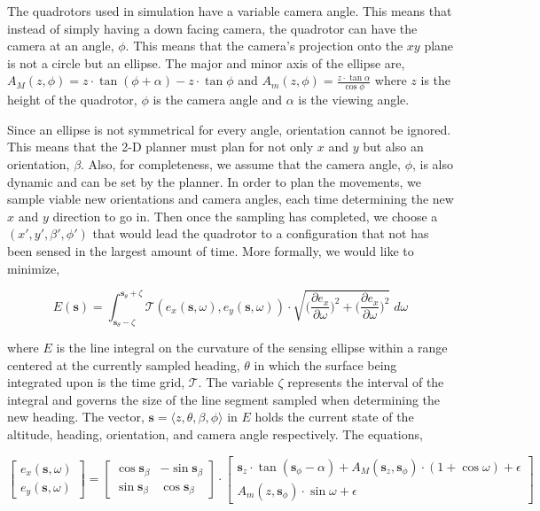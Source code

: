 \documentclass[12pt]{article}
\newcommand{\s}{\textbf{s}}
\begin{document}
The quadrotors used in simulation have a variable camera angle. This means that
instead of simply having a down facing camera, the quadrotor can have the
camera at an angle, $\phi$. This means that the camera's projection onto the
$xy$ plane is not a circle but an ellipse. The major and minor axis of the
ellipse are, $ A_M(z, \phi) = z \cdot \tan{(\phi + \alpha)} - z \cdot
\tan{\phi} $ and $ A_m(z, \phi) = \frac{z \cdot \tan{\alpha}}{\cos{\phi}} $
where $z$ is the height of the quadrotor, $\phi$ is the camera angle and
$\alpha$ is the viewing angle.

Since an ellipse is not symmetrical for every angle, orientation cannot be
ignored.  This means that the 2-D planner must plan for not only $x$ and $y$
but also an orientation, $\beta$. Also, for completeness, we assume that the
camera angle, $\phi$, is also dynamic and can be set by the planner. In order
to plan the movements, we sample viable new orientations and camera angles,
each time determining the new $x$ and $y$ direction to go in.  Then once the
sampling has completed, we choose a $(x', y',
\beta', \phi')$ that would lead the quadrotor to a configuration that not has
been sensed in the largest amount of time. More formally, we would like to
minimize,

$$ E(\s) = \int_{\s_{\theta} - \zeta}^{\s_{\theta} + \zeta}
\mathcal{T}(e_x(\s, \omega), e_y(\s, \omega)) \cdot \sqrt{
    \Big(\frac{\partial e_x}{\partial \omega}\Big) ^ 2 +
\Big(\frac{\partial e_x}{\partial \omega}\Big) ^ 2} \;d\omega$$

where $E$ is the line integral on the curvature of the sensing ellipse within a
range centered at the currently sampled heading, $\theta$ in which the surface
being integrated upon is the time grid, $\mathcal{T}$. The variable $\zeta$
represents the interval of the integral and governs the size of the line
segment sampled when determining the new heading. The vector, $\s =
\langle z, \theta, \beta, \phi \rangle$ in $E$ holds the current state
of the altitude, heading, orientation, and camera angle respectively. The
equations,

$$
\begin{bmatrix}
    e_x(\s, \omega) \\[0.2em] e_y(\s, \omega)
\end{bmatrix} = \begin{bmatrix} \cos{\s_{\beta}} & -\sin{\s_{\beta}} \\[0.2em]
    \sin{\s_{\beta}}
& \cos{\s_{\beta}} \end{bmatrix}\cdot \begin{bmatrix} \s_z \cdot 
    \tan(\s_{\phi} - \alpha) +
    A_M(\s_z, \s_{\phi}) \cdot (1 + \cos{\omega}) + \epsilon \\[0.2em]
    A_m(z, \s_{\phi}) \cdot
\sin{\omega} + \epsilon \end{bmatrix} $$
\end{document}
